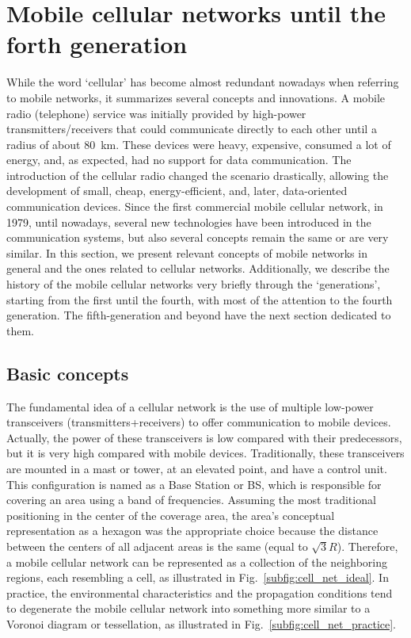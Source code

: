 \section{Mobile cellular networks until the forth generation}\label{sec:redesMoveis}

While the word `cellular' has become almost redundant nowadays when referring to mobile networks, it summarizes several concepts and innovations. A mobile radio (telephone) service was initially provided by high-power transmitters/receivers that could communicate directly to each other until a radius of about 80~km. These devices were heavy, expensive, consumed a lot of energy, and, as expected, had no support for data communication. The introduction of the cellular radio changed the scenario drastically, allowing the development of small, cheap, energy-efficient, and, later, data-oriented communication devices. Since the first commercial mobile cellular network, in 1979, until nowadays, several new technologies have been introduced in the communication systems, but also several concepts remain the same or are very similar. In this section, we present relevant concepts of mobile networks in general and the ones related to cellular networks. Additionally, we describe the history of the mobile cellular networks very briefly through the `generations', starting from the first until the fourth, with most of the attention to the fourth generation. The fifth-generation and beyond have the next section dedicated to them.


\subsection{Basic concepts}

The fundamental idea of a cellular network is the use of multiple low-power transceivers (transmitters+receivers) to offer communication to mobile devices. Actually, the power of these transceivers is low compared with their predecessors, but it is very high compared with mobile devices. Traditionally, these transceivers are mounted in a mast or tower, at an elevated point, and have a control unit. This configuration is named as a Base Station or BS, which is responsible for covering an area using a band of frequencies. Assuming the most traditional positioning in the center of the coverage area, the area's conceptual representation as a hexagon was the appropriate choice because the distance between the centers of all adjacent areas is the same (equal to $\sqrt{3}R$). Therefore, a mobile cellular network can be represented as a collection of the neighboring regions, each resembling a cell, as illustrated in Fig.~\ref{subfig:cell_net_ideal}. In practice, the environmental characteristics and the propagation conditions tend to degenerate the mobile cellular network into something more similar to a Voronoi diagram or tessellation, as illustrated in Fig.~\ref{subfig:cell_net_practice}.


